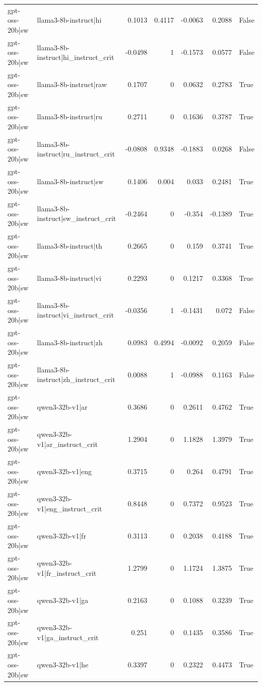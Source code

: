 \begin{table}
\begin{tabular}{l l r r r r l}
gpt-oss-20b|sw & llama3-8b-instruct|hi & 0.1013 & 0.4117 & -0.0063 & 0.2088 & False \\
gpt-oss-20b|sw & llama3-8b-instruct|hi_instruct_crit & -0.0498 & 1 & -0.1573 & 0.0577 & False \\
gpt-oss-20b|sw & llama3-8b-instruct|raw & 0.1707 & 0 & 0.0632 & 0.2783 & True \\
gpt-oss-20b|sw & llama3-8b-instruct|ru & 0.2711 & 0 & 0.1636 & 0.3787 & True \\
gpt-oss-20b|sw & llama3-8b-instruct|ru_instruct_crit & -0.0808 & 0.9348 & -0.1883 & 0.0268 & False \\
gpt-oss-20b|sw & llama3-8b-instruct|sw & 0.1406 & 0.004 & 0.033 & 0.2481 & True \\
gpt-oss-20b|sw & llama3-8b-instruct|sw_instruct_crit & -0.2464 & 0 & -0.354 & -0.1389 & True \\
gpt-oss-20b|sw & llama3-8b-instruct|th & 0.2665 & 0 & 0.159 & 0.3741 & True \\
gpt-oss-20b|sw & llama3-8b-instruct|vi & 0.2293 & 0 & 0.1217 & 0.3368 & True \\
gpt-oss-20b|sw & llama3-8b-instruct|vi_instruct_crit & -0.0356 & 1 & -0.1431 & 0.072 & False \\
gpt-oss-20b|sw & llama3-8b-instruct|zh & 0.0983 & 0.4994 & -0.0092 & 0.2059 & False \\
gpt-oss-20b|sw & llama3-8b-instruct|zh_instruct_crit & 0.0088 & 1 & -0.0988 & 0.1163 & False \\
gpt-oss-20b|sw & qwen3-32b-v1|ar & 0.3686 & 0 & 0.2611 & 0.4762 & True \\
gpt-oss-20b|sw & qwen3-32b-v1|ar_instruct_crit & 1.2904 & 0 & 1.1828 & 1.3979 & True \\
gpt-oss-20b|sw & qwen3-32b-v1|eng & 0.3715 & 0 & 0.264 & 0.4791 & True \\
gpt-oss-20b|sw & qwen3-32b-v1|eng_instruct_crit & 0.8448 & 0 & 0.7372 & 0.9523 & True \\
gpt-oss-20b|sw & qwen3-32b-v1|fr & 0.3113 & 0 & 0.2038 & 0.4188 & True \\
gpt-oss-20b|sw & qwen3-32b-v1|fr_instruct_crit & 1.2799 & 0 & 1.1724 & 1.3875 & True \\
gpt-oss-20b|sw & qwen3-32b-v1|ga & 0.2163 & 0 & 0.1088 & 0.3239 & True \\
gpt-oss-20b|sw & qwen3-32b-v1|ga_instruct_crit & 0.251 & 0 & 0.1435 & 0.3586 & True \\
gpt-oss-20b|sw & qwen3-32b-v1|he & 0.3397 & 0 & 0.2322 & 0.4473 & True \\

\end{tabular}
\end{table}
